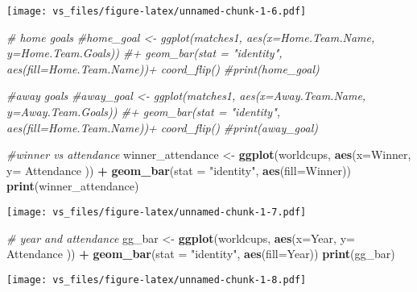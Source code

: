 \documentclass[]{article}
\newenvironment{Shaded}{\begin{snugshade}}{\end{snugshade}}
\newcommand{\KeywordTok}[1]{\textcolor[rgb]{0.13,0.29,0.53}{\textbf{#1}}}
\newcommand{\DataTypeTok}[1]{\textcolor[rgb]{0.13,0.29,0.53}{#1}}
\newcommand{\StringTok}[1]{\textcolor[rgb]{0.31,0.60,0.02}{#1}}
\newcommand{\CommentTok}[1]{\textcolor[rgb]{0.56,0.35,0.01}{\textit{#1}}}
\newcommand{\OperatorTok}[1]{\textcolor[rgb]{0.81,0.36,0.00}{\textbf{#1}}}
\newcommand{\NormalTok}[1]{#1}
\begin{document}
\texttt{[image: vs\_files/figure-latex/unnamed-chunk-1-6.pdf]}

\begin{Shaded}
\begin{Highlighting}[]
\CommentTok{# home goals}
\CommentTok{#home_goal <- ggplot(matches1, aes(x=Home.Team.Name, y=Home.Team.Goals)) #+ geom_bar(stat = "identity", aes(fill=Home.Team.Name))+ coord_flip()}
\CommentTok{#print(home_goal)}

\CommentTok{#away goals}
\CommentTok{#away_goal <- ggplot(matches1, aes(x=Away.Team.Name, y=Away.Team.Goals)) #+ geom_bar(stat = "identity", aes(fill=Home.Team.Name))+ coord_flip()}
\CommentTok{#print(away_goal)}

\CommentTok{#winner vs attendance}
\NormalTok{winner_attendance <-}\StringTok{ }\KeywordTok{ggplot}\NormalTok{(worldcups, }\KeywordTok{aes}\NormalTok{(}\DataTypeTok{x=}\NormalTok{Winner, }\DataTypeTok{y=}\NormalTok{ Attendance )) }\OperatorTok{+}\StringTok{ }\KeywordTok{geom_bar}\NormalTok{(}\DataTypeTok{stat =} \StringTok{"identity"}\NormalTok{, }\KeywordTok{aes}\NormalTok{(}\DataTypeTok{fill=}\NormalTok{Winner))}
\KeywordTok{print}\NormalTok{(winner_attendance)}
\end{Highlighting}
\end{Shaded}

\texttt{[image: vs\_files/figure-latex/unnamed-chunk-1-7.pdf]}

\begin{Shaded}
\begin{Highlighting}[]
\CommentTok{# year and attendance }
\NormalTok{gg_bar <-}\StringTok{ }\KeywordTok{ggplot}\NormalTok{(worldcups, }\KeywordTok{aes}\NormalTok{(}\DataTypeTok{x=}\NormalTok{Year, }\DataTypeTok{y=}\NormalTok{ Attendance )) }\OperatorTok{+}\StringTok{ }\KeywordTok{geom_bar}\NormalTok{(}\DataTypeTok{stat =} \StringTok{"identity"}\NormalTok{, }\KeywordTok{aes}\NormalTok{(}\DataTypeTok{fill=}\NormalTok{Year))}
\KeywordTok{print}\NormalTok{(gg_bar)}
\end{Highlighting}
\end{Shaded}

\texttt{[image: vs\_files/figure-latex/unnamed-chunk-1-8.pdf]}
\end{document}
